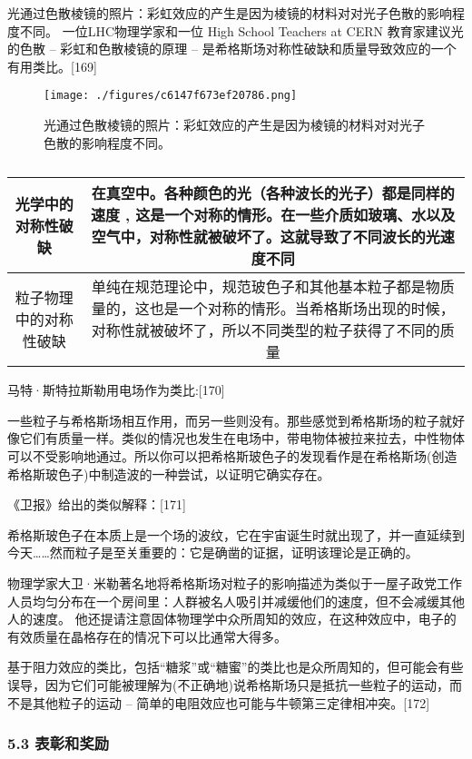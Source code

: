 光通过色散棱镜的照片：彩虹效应的产生是因为棱镜的材料对对光子色散的影响程度不同。
一位LHC物理学家和一位 High School Teachers at CERN 教育家建议光的色散 – 彩虹和色散棱镜的原理 – 是希格斯场对称性破缺和质量导致效应的一个有用类比。[169]

\begin{figure}[ht]
\centering
\texttt{[image: ./figures/c6147f673ef20786.png]}
\caption{光通过色散棱镜的照片：彩虹效应的产生是因为棱镜的材料对对光子色散的影响程度不同。} \label{fig_Higgs_15}
\end{figure}

\begin{table}[ht]
\centering
\caption\label{tab_Higgs}
\begin{tabular}{|c|c}
\hline
 光学中的对称性破缺&在真空中。各种颜色的光（各种波长的光子）都是同样的速度 , 这是一个对称的情形。在一些介质如玻璃、水以及空气中，对称性就被破坏了。这就导致了不同波长的光速度不同 \\
\hline
粒子物理中的对称性破缺&单纯在规范理论中，规范玻色子和其他基本粒子都是物质量的，这也是一个对称的情形。当希格斯场出现的时候，对称性就被破坏了，所以不同类型的粒子获得了不同的质量\\
\hline
\end{tabular}
\end{table}

马特·斯特拉斯勒用电场作为类比:[170]

一些粒子与希格斯场相互作用，而另一些则没有。那些感觉到希格斯场的粒子就好像它们有质量一样。类似的情况也发生在电场中，带电物体被拉来拉去，中性物体可以不受影响地通过。所以你可以把希格斯玻色子的发现看作是在希格斯场(创造希格斯玻色子)中制造波的一种尝试，以证明它确实存在。

《卫报》给出的类似解释：[171]

希格斯玻色子在本质上是一个场的波纹，它在宇宙诞生时就出现了，并一直延续到今天……然而粒子是至关重要的：它是确凿的证据，证明该理论是正确的。

物理学家大卫·米勒著名地将希格斯场对粒子的影响描述为类似于一屋子政党工作人员均匀分布在一个房间里：人群被名人吸引并减缓他们的速度，但不会减缓其他人的速度。 他还提请注意固体物理学中众所周知的效应，在这种效应中，电子的有效质量在晶格存在的情况下可以比通常大得多。

基于阻力效应的类比，包括“糖浆”或“糖蜜”的类比也是众所周知的，但可能会有些误导，因为它们可能被理解为(不正确地)说希格斯场只是抵抗一些粒子的运动，而不是其他粒子的运动 – 简单的电阻效应也可能与牛顿第三定律相冲突。[172]

\subsubsection{5.3 表彰和奖励}
 
